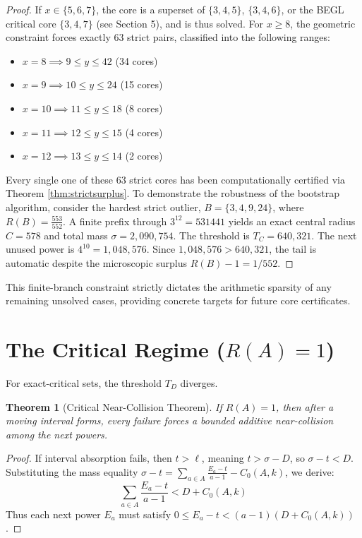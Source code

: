 \documentclass[12pt,reqno]{amsart}
\newtheorem{theorem}{Theorem}[section]
\theoremstyle{definition}
\begin{document}
\begin{proof}
If $x \in \{5, 6, 7\}$, the core is a superset of $\{3,4,5\}$, $\{3,4,6\}$, or the BEGL critical core $\{3,4,7\}$ (see Section 5), and is thus solved.
For $x \ge 8$, the geometric constraint forces exactly 63 strict pairs, classified into the following ranges:
\begin{itemize}
\item $x=8 \implies 9 \le y \le 42$ (34 cores)
\item $x=9 \implies 10 \le y \le 24$ (15 cores)
\item $x=10 \implies 11 \le y \le 18$ (8 cores)
\item $x=11 \implies 12 \le y \le 15$ (4 cores)
\item $x=12 \implies 13 \le y \le 14$ (2 cores)
\end{itemize}

Every single one of these 63 strict cores has been computationally certified via Theorem \ref{thm:strictsurplus}. 
To demonstrate the robustness of the bootstrap algorithm, consider the hardest strict outlier, $B = \{3,4,9,24\}$, where $R(B) = \frac{553}{552}$. A finite prefix through $3^{12} = 531441$ yields an exact central radius $C = 578$ and total mass $\sigma = 2,090,754$. The threshold is $T_C = 640,321$. The next unused power is $4^{10} = 1,048,576$. Since $1,048,576 > 640,321$, the tail is automatic despite the microscopic surplus $R(B)-1 = 1/552$.
\end{proof}

This finite-branch constraint strictly dictates the arithmetic sparsity of any remaining unsolved cases, providing concrete targets for future core certificates.

\section{The Critical Regime ($R(A) = 1$)}

For exact-critical sets, the threshold $T_D$ diverges. 

\begin{theorem}[Critical Near-Collision Theorem]
If $R(A) = 1$, then after a moving interval forms, every failure forces a bounded additive near-collision among the next powers.
\end{theorem}

\begin{proof}
If interval absorption fails, then $t > \ell$, meaning $t > \sigma - D$, so $\sigma - t < D$. Substituting the mass equality $\sigma - t = \sum_{a \in A} \frac{E_a - t}{a-1} - C_0(A,k)$, we derive:
\[ \sum_{a \in A} \frac{E_a - t}{a-1} < D + C_0(A,k) \]
Thus each next power $E_a$ must satisfy $0 \le E_a - t < (a-1)(D + C_0(A,k))$.
\end{proof}
\end{document}
